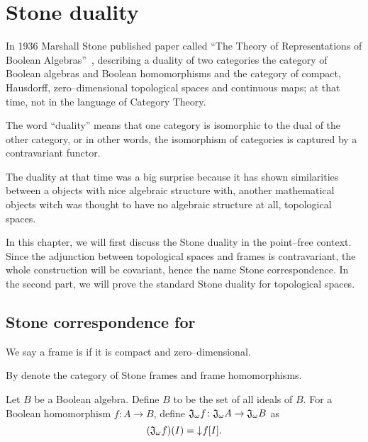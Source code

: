 \chapter{Stone duality}

In 1936 Marshall Stone published paper called ``The Theory of Representations of Boolean Algebras''~\cite{??}, describing a duality of two categories the category of Boolean algebras and Boolean homomorphisms and the category of compact, Hausdorff, zero--dimensional topological spaces and continuous maps; at that time, not in the language of Category Theory.

The word ``duality'' means that one category is isomorphic to the dual of the other category, or in other words, the isomorphism of categories is captured by a contravariant functor.

The duality at that time was a big surprise because it has shown similarities between a objects with nice algebraic structure with, another mathematical objects witch was thought to have no algebraic structure at all, topological spaces.

In this chapter, we will first discuss the Stone duality in the point--free context. Since the adjunction between topological spaces and frames is contravariant, the whole construction will be covariant, hence the name Stone correspondence. In the second part, we will prove the standard Stone duality for topological spaces.

\section{Stone correspondence for \StoneFrm}

\begin{definition}
    We say a frame is  if it is compact and zero--dimensional.

    By \DEF{\StoneFrm{}} denote the category of Stone frames and frame homomorphisms.
\end{definition}

\begin{definition}
    Let $B$ be a Boolean algebra. Define $B$ to be the set of all ideals of $B$.
    For a Boolean homomorphism $f\colon A \to B$, define $\mathfrak{J}_{\omega} f\colon \mathfrak{J}_{\omega} A \to \mathfrak{J}_{\omega} B$ as
    $$(\mathfrak{J}_{\omega} f)(I) = \mathord{\downarrow}\mkern1mu f[I].$$
\end{definition}


